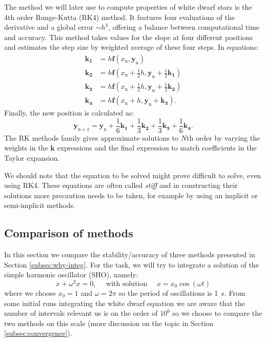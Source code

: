 \documentclass[]{article}
\renewcommand{\vec}[1]{\boldsymbol{#1}}
\begin{document}
	The method we will later use to compute properties of white dwarf stars is the 4th order Runge-Kutta (RK4) method. It features four evaluations of the derivative and a global error $\sim h^4$, offering a balance between computational time and accuracy. This method takes values for the slope at four different positions and estimates the step size by weighted average of these four steps. In equations:
	\begin{align*}
		\vec{k_1} &= h \vec{f}(x_\mathrm{n}, \vec{y}_\mathrm{n})\\
		\vec{k_2} &= h \vec{f}\left(x_\mathrm{n} + \frac{1}{2} h, \vec{y}_\mathrm{n} + \frac{1}{2}\vec{k_1}\right)\\
		\vec{k_3} &= h \vec{f}\left(x_\mathrm{n} + \frac{1}{2} h, \vec{y}_\mathrm{n} + \frac{1}{2}\vec{k_2}\right)\\
		\vec{k_4} &= h \vec{f}(x_\mathrm{n} + h, \vec{y}_\mathrm{n} + \vec{k_3}).
	\end{align*}
	Finally, the new position is calculated as:
	\begin{equation}
		\vec{y}_\mathrm{n+1} = \vec{y}_\mathrm{n} + \frac{1}{6} \vec{k_1} + \frac{1}{3} \vec{k_2} + \frac{1}{3} \vec{k_3} + \frac{1}{6} \vec{k_4}.
	\end{equation}
	The RK methods family gives approximate solutions to $N$th order by varying the weights in the $\vec{k}$ expressions and the final expression to match coefficients in the Taylor expansion.

	We should note that the equation to be solved might prove difficult to solve, even using RK4. These equations are often called \emph{stiff} and in constructing their solutions more precaution needs to be taken, for example by using an implicit or semi-implicit methods.

\subsection{Comparison of methods}
	In this section we compare the stability/accuracy of three methods presented in Section \ref{subsec:why-integ}. For the task, we will try to integrate a solution of the simple harmonic oscillator (SHO), namely:
	\begin{equation}
		\ddot{x} + \omega^2 x = 0, \quad \text{ with solution } \quad x = x_0 \cos(\omega t)
	\end{equation}
	where we choose $x_0 = 1$ and $\omega = 2 \pi$ so the period of oscillations is \SI{1}{s}. From some initial runs integrating the white  dwarf equation we are aware that the number of intervals relevant us is on the order of $10^{6}$ so we choose to compare the two methods on this scale (more discussion on the topic in Section \ref{subsec:convergence}).
\end{document}
